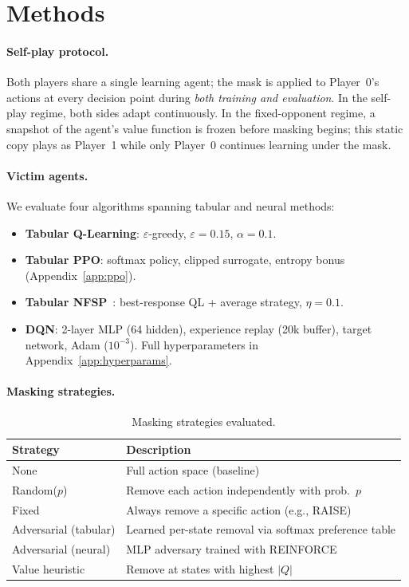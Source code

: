 \documentclass{article}
\begin{document}
\section{Methods}

\paragraph{Self-play protocol.}
Both players share a single learning agent; the mask is applied to Player~0's actions at every decision point during \emph{both training and evaluation}. In the self-play regime, both sides adapt continuously. In the fixed-opponent regime, a snapshot of the agent's value function is frozen before masking begins; this static copy plays as Player~1 while only Player~0 continues learning under the mask.

\paragraph{Victim agents.}
We evaluate four algorithms spanning tabular and neural methods:
\begin{itemize}
\item \textbf{Tabular Q-Learning}: $\varepsilon$-greedy, $\varepsilon = 0.15$, $\alpha = 0.1$.
\item \textbf{Tabular PPO}: softmax policy, clipped surrogate, entropy bonus (Appendix~\ref{app:ppo}).
\item \textbf{Tabular NFSP}~\citep{heinrich2016deep}: best-response QL + average strategy, $\eta = 0.1$.
\item \textbf{DQN}: 2-layer MLP (64 hidden), experience replay (20k buffer), target network, Adam ($10^{-3}$). Full hyperparameters in Appendix~\ref{app:hyperparams}.
\end{itemize}

\paragraph{Masking strategies.}
\begin{table}[ht]
\centering
\caption{Masking strategies evaluated.}
\label{tab:strategies}
\begin{tabular}{ll}
\toprule
Strategy & Description \\
\midrule
None & Full action space (baseline) \\
Random($p$) & Remove each action independently with prob.\ $p$ \\
Fixed & Always remove a specific action (e.g., RAISE) \\
Adversarial (tabular) & Learned per-state removal via softmax preference table \\
Adversarial (neural) & MLP adversary trained with REINFORCE \\
Value heuristic & Remove at states with highest $|Q|$ \\
\bottomrule
\end{tabular}
\end{table}
\end{document}
